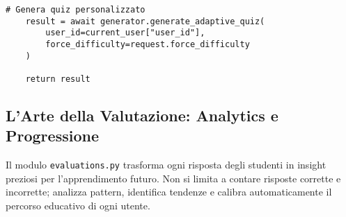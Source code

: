 \documentclass[a4paper, 14pt, oneside]{extbook}
\begin{document}
\begin{lstlisting}[style=pythonstyle, caption=Generatore Quiz Adattivo - Logica Avanzata, label=lst:adaptive-quiz]
    # Genera quiz personalizzato
    result = await generator.generate_adaptive_quiz(
        user_id=current_user["user_id"],
        force_difficulty=request.force_difficulty
    )
    
    return result
\end{lstlisting}

\subsection{L'Arte della Valutazione: Analytics e Progressione}

Il modulo \texttt{evaluations.py} trasforma ogni risposta degli studenti in insight preziosi per l'apprendimento futuro. Non si limita a contare risposte corrette e incorrette; analizza pattern, identifica tendenze e calibra automaticamente il percorso educativo di ogni utente.
\end{document}
